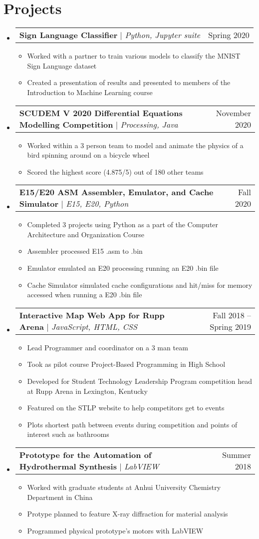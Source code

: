 \documentclass[letterpaper,11pt]{article}
\makeatletter
\newcommand{\resumeItem}[1]{
  \item\small{
    {#1 \vspace{-2pt}}
  }
}
\newcommand{\resumeProjectHeading}[2]{
    \item
    \begin{tabular*}{0.97\textwidth}{l@{\extracolsep{\fill}}r}
      \small#1 & #2 \\
    \end{tabular*}\vspace{-7pt}
}
\newcommand{\resumeSubHeadingListStart}{\begin{itemize}[leftmargin=0.15in, label={}]}
\newcommand{\resumeSubHeadingListEnd}{\end{itemize}}
\newcommand{\resumeItemListStart}{\begin{itemize}}
\newcommand{\resumeItemListEnd}{\end{itemize}\vspace{-5pt}}
\makeatother
\begin{document}
\section{Projects}
    \resumeSubHeadingListStart
        \resumeProjectHeading
          {\textbf{Sign Language Classifier} $|$ \emph{Python, Jupyter suite}}{Spring 2020}
          \resumeItemListStart
            \resumeItem{Worked with a partner to train various models to classify the MNIST Sign Language dataset}
            \resumeItem{Created a presentation of results and presented to members of the Introduction to Machine Learning course}
      \resumeItemListEnd
        \resumeProjectHeading
          {\textbf{SCUDEM V 2020 Differential Equations Modelling Competition} $|$ \emph{Processing, Java}}{November 2020}
          \resumeItemListStart
            \resumeItem{Worked within a 3 person team to model and animate the physics of a bird spinning around on a bicycle wheel}
            \resumeItem{Scored the highest score (4.875/5) out of 180 other teams}
      \resumeItemListEnd
      \resumeProjectHeading
          {\textbf{E15/E20 ASM Assembler, Emulator, and Cache Simulator} $|$ \emph{E15, E20, Python}}{Fall 2020}
          \resumeItemListStart
            \resumeItem{Completed 3 projects using Python as a part of the Computer Architecture and Organization Course}
            \resumeItem{Assembler processed E15 .asm to .bin}
            \resumeItem{Emulator emulated an E20 processing running an E20 .bin file}
            \resumeItem{Cache Simulator simulated cache configurations and hit/miss for memory accessed when running a E20 .bin file}
      \resumeItemListEnd
        \resumeProjectHeading
          {\textbf{Interactive Map Web App for Rupp Arena} $|$ \emph{JavaScript, HTML, CSS}}{Fall 2018 -- Spring 2019}
          \resumeItemListStart
            \resumeItem{Lead Programmer and coordinator on a 3 man team}
            \resumeItem{Took as pilot course Project-Based Programming in High School}
            \resumeItem{Developed for Student Technology Leadership Program competition head at Rupp Arena in Lexington, Kentucky}
            \resumeItem{Featured on the STLP website to help competitors get to events}
            \resumeItem{Plots shortest path between events during competition and points of interest such as bathrooms}
      \resumeItemListEnd
        \resumeProjectHeading
          {\textbf{Prototype for the Automation of Hydrothermal Synthesis} $|$ \emph{LabVIEW}}{Summer 2018}
          \resumeItemListStart
            \resumeItem{Worked with graduate students at Anhui University Chemistry Department in China}
            \resumeItem{Protype planned to feature X-ray diffraction for material analysis}
            \resumeItem{Programmed physical prototype's motors with LabVIEW}
      \resumeItemListEnd
    \resumeSubHeadingListEnd
%
\end{document}
